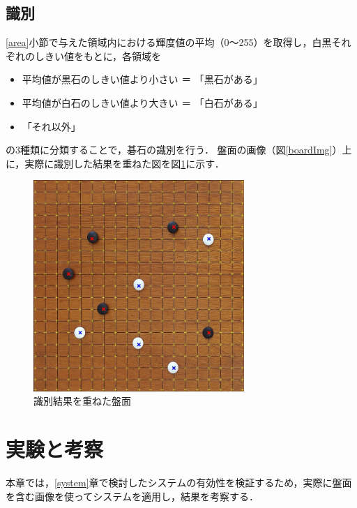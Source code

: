 \documentclass[openright]{nitocs}
\numberwithin{equation}{section}
\begin{document}
        \subsection{識別} \label{identify}  
            \ref{area}小節で与えた領域内における輝度値の平均（0～255）を取得し，白黒それぞれのしきい値をもとに，各領域を
            \begin{itemize} %
                \item 平均値が黒石のしきい値より小さい ＝ 「黒石がある」
                \item 平均値が白石のしきい値より大きい ＝ 「白石がある」
                \item 「それ以外」
            \end{itemize}
            の3種類に分類することで，碁石の識別を行う．
            盤面の画像（図\ref{boardImg}）上に，実際に識別した結果を重ねた図を図\ref{result}に示す．

            \begin{figure}[tb] %
                \begin{center}
                \includegraphics[clip,width=80mm]{result.jpg} 
                \caption{識別結果を重ねた盤面}
                \label{result}
                \end{center}
            \end{figure}

    \section{実験と考察} %
        本章では，\ref{system}章で検討したシステムの有効性を検証するため，実際に盤面を含む画像を使ってシステムを適用し，結果を考察する．
\end{document}
